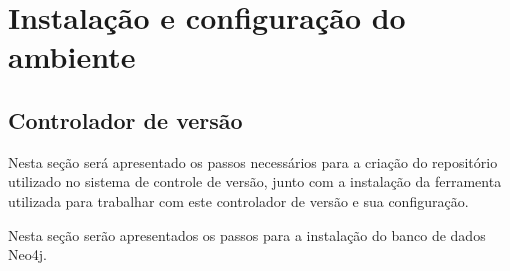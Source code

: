 \chapter*{Instalação e configuração do ambiente}
\label{apendice:1}

\section*{Controlador de versão}

Nesta seção será apresentado os passos necessários para a criação do repositório utilizado no sistema de controle de versão, junto com a instalação da ferramenta utilizada para trabalhar com este controlador de versão e sua configuração.

 
Nesta seção serão apresentados os passos para a instalação do banco de dados Neo4j.